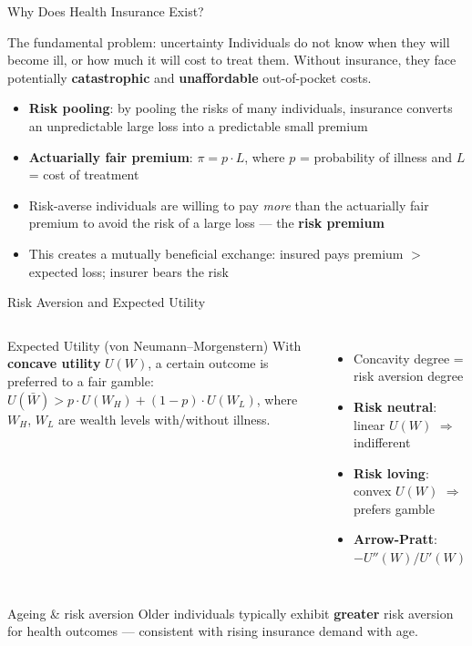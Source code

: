 \documentclass[aspectratio=169, 12pt]{beamer}
\begin{document}
\begin{frame}{Why Does Health Insurance Exist?}
  \begin{block}{The fundamental problem: uncertainty}
    Individuals do not know when they will become ill, or how much it will cost to treat them.
    Without insurance, they face potentially \textbf{catastrophic} and \textbf{unaffordable}
    out-of-pocket costs.
  \end{block}
  \begin{itemize}
    \item \textbf{Risk pooling}: by pooling the risks of many individuals, insurance converts
          an unpredictable large loss into a predictable small premium
    \item \textbf{Actuarially fair premium}: $\pi = p \cdot L$, where $p$ = probability of
          illness and $L$ = cost of treatment
    \item Risk-averse individuals are willing to pay \emph{more} than the actuarially fair
          premium to avoid the risk of a large loss --- the \textbf{risk premium}
    \item This creates a mutually beneficial exchange: insured pays premium $>$ expected loss;
          insurer bears the risk
  \end{itemize}
\end{frame}

\begin{frame}{Risk Aversion and Expected Utility}
  \begin{columns}
      \begin{block}{Expected Utility (von Neumann--Morgenstern)}
        \small With \textbf{concave utility} $U(W)$, a certain outcome is preferred to a fair
        gamble: $U(\bar{W}) > p \cdot U(W_H) + (1-p) \cdot U(W_L)$, where $W_H$, $W_L$ are
        wealth levels with/without illness.
      \end{block}
      \small
      \begin{itemize}
        \item Concavity degree = risk aversion degree
        \item \textbf{Risk neutral}: linear $U(W)$ $\Rightarrow$ indifferent
        \item \textbf{Risk loving}: convex $U(W)$ $\Rightarrow$ prefers gamble
        \item \textbf{Arrow-Pratt}: $-U''(W)/U'(W)$
      \end{itemize}
  \end{columns}
  \begin{alertblock}{Ageing \& risk aversion}
    \small Older individuals typically exhibit \textbf{greater} risk aversion for health outcomes
    --- consistent with rising insurance demand with age.
  \end{alertblock}
\end{frame}
\end{document}
